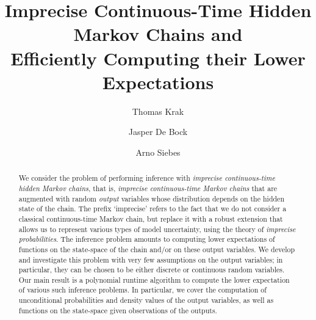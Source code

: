 \documentclass[3p]{elsarticle}
\begin{document}
\begin{frontmatter}

\title{Imprecise Continuous-Time Hidden Markov Chains and \\Efficiently Computing their Lower Expectations}
\author[theghentaddress]{Thomas Krak}

\author[theghentaddress]{Jasper De Bock}

\author[theuuaddress]{Arno Siebes}

\address[theghentaddress]{Ghent University, Department of Electronics and Information Systems,
Technologiepark -- Zwijnaarde 914,
9052 Zwijnaarde, Belgium}

\address[theuuaddress]{Utrecht University, Department of Information and Computing Sciences, Princetonplein 5, De Uithof, 3584 CC Utrecht, The Netherlands}





\begin{abstract}We consider the problem of performing inference with \emph{imprecise continuous-time hidden Markov chains}, that is, \emph{imprecise continuous-time Markov chains} that are augmented with random \emph{output} variables whose distribution depends on the hidden state of the chain. The prefix `imprecise' refers to the fact that we do not consider a classical continuous-time Markov chain, but replace it with a robust extension that allows us to represent various types of model uncertainty, using the theory of \emph{imprecise probabilities}. The inference problem amounts to computing lower expectations of functions on the state-space of the chain and/or on these output variables.
We develop and investigate this problem with very few assumptions on the output variables; in particular, they can be chosen to be either discrete or continuous random variables. Our main result is a polynomial runtime algorithm to compute the lower expectation of various such inference problems. In particular, we cover the computation of unconditional probabilities and density values of the output variables, as well as functions on the state-space given observations of the outputs.\vspace{-3pt}
\end{abstract}


\end{frontmatter}
\end{document}
